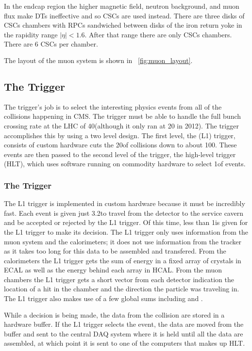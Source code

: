 In the endcap region the higher magnetic field, neutron background, and muon
flux make DTs ineffective and so CSCs are used instead. There are three disks
of CSCs chambers with RPCs sandwiched between disks of the iron return yoke in
the rapidity range $|\eta| < 1.6$. After that range there are only CSCs
chambers. There are 6 CSCs per chamber.

The layout of the muon system is shown in \FIG~\ref{fig:muon_layout}.

\subsection{The Trigger}
\label{ssec:trigger}

The trigger's job is to select the interesting physics events from all of the
collisions happening in CMS. The trigger must be able to handle the full bunch
crossing rate at the LHC of 40\megahertz (although it only ran at 20\megahertz
in 2012). The trigger accomplishes this by using a two level design. The first
level, the \Lone (L1) trigger, consists of custom hardware cuts the
20\megahertz of collisions down to about 100\kilohertz. These events are then
passed to the second level of the trigger, the high-level trigger (HLT), which
uses software running on commodity hardware to select 1\kilohertz of events.

\subsubsection{The \Lone Trigger}

The L1 trigger is implemented in custom hardware because it must be incredibly
fast. Each event is given just 3.2\microseconds to travel from the detector to
the service cavern and be accepted or rejected by the L1 trigger. Of this time,
less than 1\microseconds is given for the L1 trigger to make its decision. The
L1 trigger only uses information from the muon system and the calorimeters; it
does not use information from the tracker as it takes too long for this
data to be assembled and transfered. From the calorimeters the L1 trigger gets
the sum of energy in a fixed array of \fivebyfive crystals in ECAL as well as
the energy behind each array in HCAL. From the muon chambers the L1 trigger
gets a short vector from each detector indication the location of a hit in the
chamber and the direction the particle was traveling in. The L1 trigger also
makes use of a few global sums including \ET and \MET.

While a decision is being made, the data from the collision are stored in a
hardware buffer. If the L1 trigger selects the event, the data are moved from
the buffer and sent to the central DAQ system where it is held until all the
data are assembled, at which point it is sent to one of the computers that makes
up HLT.

